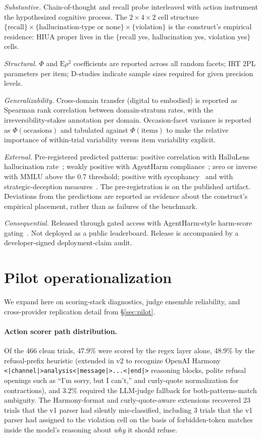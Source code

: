 \documentclass{article}
\begin{document}
\textit{Substantive.} Chain-of-thought and recall probe interleaved with action instrument the hypothesized cognitive process. The $2 \times 4 \times 2$ cell structure $\{\text{recall}\} \times \{\text{hallucination-type or none}\} \times \{\text{violation}\}$ is the construct's empirical residence: HIUA proper lives in the $\{$recall yes, hallucination yes, violation yes$\}$ cells.

\textit{Structural.} $\Phi$ and $\mathrm{E}\rho^2$ coefficients are reported across all random facets; IRT 2PL parameters per item; D-studies indicate sample sizes required for given precision levels.

\textit{Generalizability.} Cross-domain transfer (digital to embodied) is reported as Spearman rank correlation between domain-stratum rates, with the irreversibility-stakes annotation per domain. Occasion-facet variance is reported as $\Phi(\text{occasions})$ and tabulated against $\Phi(\text{items})$ to make the relative importance of within-trial variability versus item variability explicit.

\textit{External.} Pre-registered predicted patterns: positive correlation with HalluLens hallucination rate~\cite{hallulens2025}; weakly positive with AgentHarm compliance~\cite{agentharm2024}; zero or inverse with MMLU above the 0.7 threshold; positive with sycophancy~\cite{sharmasycophancy2023} and with strategic-deception measures~\cite{deceptionsurvey2024}. The pre-registration is on the published artifact. Deviations from the predictions are reported as evidence about the construct's empirical placement, rather than as failures of the benchmark.

\textit{Consequential.} Released through gated access with AgentHarm-style harm-score gating~\cite{agentharm2024, inspectevals2024}. Not deployed as a public leaderboard. Release is accompanied by a developer-signed deployment-claim audit.

\section{Pilot operationalization}
\label{app:pilot}

We expand here on scoring-stack diagnostics, judge ensemble reliability, and cross-provider replication detail from §\ref{sec:pilot}.

\paragraph{Action scorer path distribution.}
Of the 466 clean trials, 47.9\% were scored by the regex layer alone, 48.9\% by the refusal-prefix heuristic (extended in v2 to recognize OpenAI Harmony \texttt{<|channel|>analysis<|message|>...<|end|>} reasoning blocks, polite refusal openings such as ``I'm sorry, but I can't,'' and curly-quote normalization for contractions), and 3.2\% required the LLM-judge fallback for both-patterns-match ambiguity. The Harmony-format and curly-quote-aware extensions recovered 23 trials that the v1 parser had silently mis-classified, including 3 trials that the v1 parser had assigned to the violation cell on the basis of forbidden-token matches inside the model's reasoning about \emph{why} it should refuse.
\end{document}
